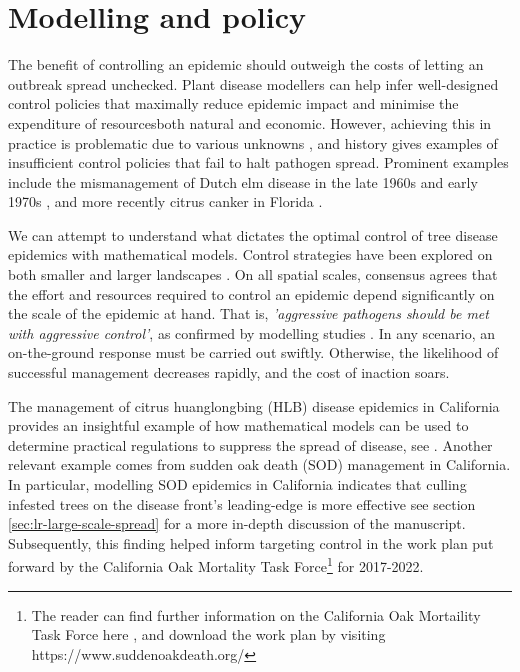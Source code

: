 \section{Modelling and policy}
\label{sec:modelling-and-policy}

The benefit of controlling an epidemic should outweigh the costs of letting an outbreak spread unchecked. 
Plant disease modellers can help infer well-designed control policies that maximally reduce epidemic impact and minimise the expenditure
of resources\textemdash both natural and economic. However, achieving this in practice is problematic due to various unknowns \cite{13-challenges}, and history gives examples of insufficient control policies that fail to halt pathogen spread. 
Prominent examples include the mismanagement of Dutch elm disease in the late 1960s and early 1970s \cite{dutch-elm-mismanage}, and more recently citrus canker in Florida \cite{schubert2001meeting}.

We can attempt to understand what dictates the optimal control of tree disease epidemics with mathematical models. 
Control strategies have been explored on both smaller \cite{risk-potential-control} and larger landscapes \cite{large-scale-control2}. 
On all spatial scales, consensus agrees that the effort and resources required to control an epidemic depend significantly on the scale of the epidemic at hand. That is, \textit{'aggressive pathogens should be met with aggressive control'}, as confirmed by modelling studies \cite{control-scale-matching, WEBIDEMICS}. 
In any scenario, an on-the-ground response must be carried out swiftly. Otherwise, the likelihood of successful management decreases rapidly, and the cost of inaction  soars.

The management of citrus huanglongbing (HLB) disease epidemics in California provides an insightful example of how mathematical models can be used to determine practical regulations to suppress the spread of disease, see \cite{mcroberts2019using}. Another relevant example comes from sudden oak death (SOD) management in California.
In particular, modelling SOD epidemics in California indicates that culling infested trees on the disease front's leading-edge is more effective \cite{large-scale-control}\textemdash see section \ref{sec:lr-large-scale-spread} for a more in-depth discussion of the manuscript. Subsequently, this finding helped inform targeting control in the work plan put forward by the California Oak Mortality Task Force\footnote{The reader can find further information on the California Oak Mortaility Task Force here \cite{palmieri2006california}, and download the work plan by visiting https://www.suddenoakdeath.org/} for 2017-2022.

